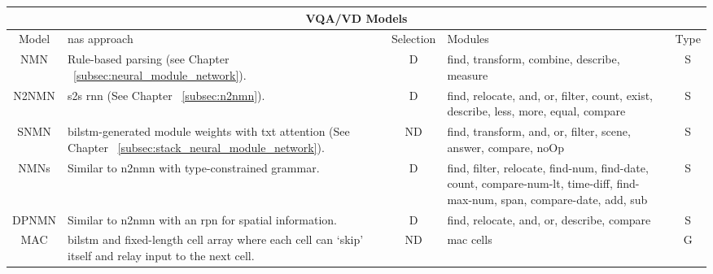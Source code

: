 \begin{table}[]
    \small
    \begin{tabularx}{\linewidth}{cXcXc}
        \toprule
        \multicolumn{5}{c}{VQA/VD Models}                                                                                                                                                                                                                                                                     \\ \midrule
        Model                              & \gls{nas} approach                                                                                                & Selection & Modules                                                                                                                   & Type \\
        NMN                                & Rule-based parsing (see Chapter ~\ref{subsec:neural_module_network}).                                             & D         & ﬁnd, transform, combine, describe, measure                                                                                & S    \\
        N2NMN                              & \gls{s2s} \gls{rnn} (See Chapter ~\ref{subsec:n2nmn}).                                                            & D         & ﬁnd, relocate, and, or, ﬁlter, count, exist, describe, less, more, equal, compare                                         & S    \\
        SNMN                               & \gls{bilstm}-generated module weights with txt attention (See Chapter ~\ref{subsec:stack_neural_module_network}). & ND        & ﬁnd, transform, and, or, ﬁlter, scene, answer, compare, noOp                                                              & S    \\
        NMNs\pm{}\cite{chen_teaching_2022} & Similar to \gls{n2nmn} with type-constrained grammar\cite{gupta_answering_2020}.                                  & D         & find, filter, relocate, find-num, find-date, count, compare-num-lt, time-diff, find-max-num, span, compare-date, add, sub & S    \\
        DPNMN                              & Similar to \gls{n2nmn} with an \gls{rpn} for spatial information.                                                 & D         & find, relocate, and, or, describe, compare                                                                                & S    \\
        MAC                                & \gls{bilstm} and fixed-length cell array where each cell can `skip' itself and relay input to the next cell.      & ND        & \gls{mac} cells                                                                                                           & G    \\

\end{tabularx}
\end{table}
